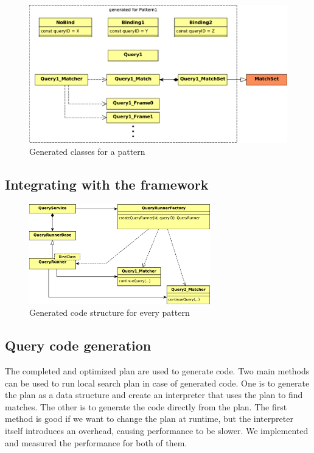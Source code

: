 \begin{figure}[h]
	\begin{center}
		\includegraphics[width=\textwidth]{figures/generated-code-structure-perpattern.pdf}
		\caption{Generated classes for a pattern}
		\label{fig:generated-code-structure-perpattern}
	\end{center}
\end{figure}


\subsection{Integrating with the framework}

\begin{figure}[h]
	\begin{center}
		\includegraphics[width=0.7\textwidth]{figures/generated-code-structure-wholesome.pdf}
		\caption{Generated code structure for every pattern}
		\label{fig:generated-code-structure-wholesome}
	\end{center}
\end{figure}

\subsection{Query code generation}

The completed and optimized plan are used to generate \cpp{} code. 
Two main methods can be used to run local search plan in case of generated code. 
One is to generate the plan as a data structure and create an interpreter that uses the plan to find matches. 
The other is to generate the code directly from the plan. 
The first method is good if we want to change the plan at runtime, but the interpreter itself introduces an overhead, causing performance to be slower.
We implemented and measured the performance for both of them.

